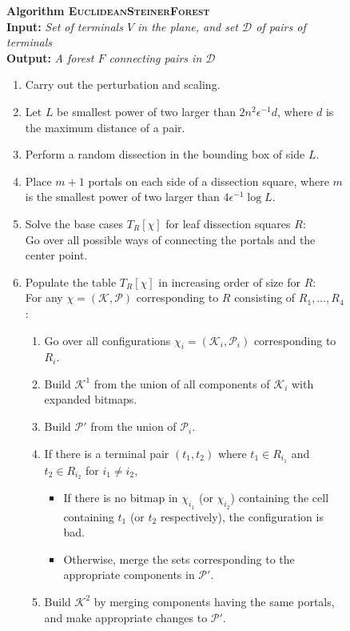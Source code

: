 \documentclass[extras,11pt]{article} \usepackage{fullpage}
\makeatletter
\theoremstyle{mytheorem}
\newcommand{\eps}{\epsilon}
\newcommand{\DD}{\mathcal{D}}
\newcommand{\algo}[1]{\textsc{#1}}
\newcommand{\algtitle}[1]{\vspace{.1cm}\textbf{#1}}
\newcommand{\alginput}[1]{\\\textbf{Input:} \textit{#1}}
\newcommand{\algoutput}[1]{\\\textbf{Output:} \textit{#1}}
{\makeatletter
 \gdef\xxxmark{\expandafter\ifx\csname @mpargs\endcsname\relax \expandafter\ifx\csname @captype\endcsname\relax \marginpar{xxx}\else
       xxx \fi
   \else
     xxx \fi}
 \gdef\xxx{\@ifnextchar[\xxx@lab\xxx@nolab}
 \long\gdef\xxx@lab[#1]#2{{\bf [\xxxmark #2 ---{\sc #1}]}}
 \long\gdef\xxx@nolab#1{{\bf [\xxxmark #1]}}
}
\makeatother
\begin{document}
\begin{figure}
\begin{algorithm}
\algtitle{Algorithm \algo{EuclideanSteinerForest}}
\alginput{Set of terminals $V$ in the plane, and set $\DD$ of pairs of terminals}
\algoutput{A forest $F$ connecting pairs in $\DD$}
\begin{enumerate}\setlength{\itemsep}{-.00in}
\item Carry out the perturbation and scaling.
\item Let $L$ be smallest power of two larger than $2n^2\eps^{-1}d$, where $d$ is the maximum distance of a pair.
\item Perform a random dissection in the bounding box of side $L$.
\item Place $m+1$ portals on each side of a dissection square, where $m$ is the smallest power of two larger than  $4\eps^{-1}\log L$.
\item Solve the base cases $T_R[\chi]$ for leaf dissection squares $R$:\\
Go over all possible ways of connecting the portals and the center point.
\item Populate the table $T_R[\chi]$ in increasing order of size for $R$:\\
      For any $\chi=(\mathcal{K},\mathcal{P})$ corresponding to $R$ consisting of $R_1,\dots,R_4$:
\begin{enumerate}\setlength{\itemsep}{-.02in}
 \item Go over all configurations $\chi_i=(\mathcal{K}_i,\mathcal{P}_i)$ corresponding to $R_i$.
 \item Build $\mathcal{K}^1$ from the union of all components of $\mathcal{K}_i$ with expanded bitmaps.
 \item Build $\mathcal{P}'$ from the union of $\mathcal{P}_i$.
 \item If there is a terminal pair $(t_1,t_2)$ where $t_1\in R_{i_1}$ and $t_2\in R_{i_2}$ for $i_1\neq i_2$,
\begin{itemize}\setlength{\itemsep}{-.02in}
 \item If there is no bitmap in $\chi_{i_1}$ (or $\chi_{i_2}$) containing the cell containing $t_1$ (or $t_2$ respectively), the configuration is bad.
 \item Otherwise, merge the sets corresponding to the appropriate components in $\mathcal{P}'$.
\end{itemize}
 \item Build $\mathcal{K}^2$ by merging components having the same portals,
  and make appropriate changes to $\mathcal{P}'$.

\end{enumerate}
\end{enumerate}
\end{algorithm}
\end{figure}
\end{document}

